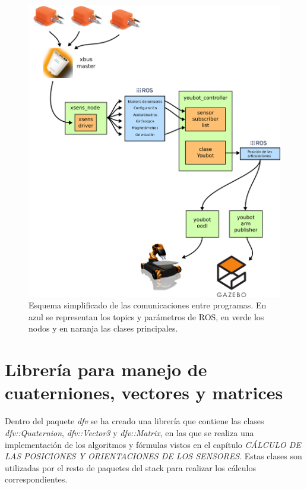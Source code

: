 \documentclass[12pt, a4paper]{report}
\begin{document}
\begin{figure}[h]
	\centering
		\includegraphics[scale=0.30]{../img/communications.png} 
	\caption[Esquema simplificado de comunicaciones]{Esquema simplificado de las comunicaciones entre programas. En azul se representan los topics y parámetros de ROS, en verde los nodos y en naranja las clases principales. } 
	\label{fig: communications}
\end{figure}

\section{Librería para manejo de cuaterniones, vectores y matrices}

Dentro del paquete \textit{dfv} se ha creado una librería que contiene las clases \textit{dfv::Quaternion}, \textit{dfv::Vector3} y \textit{dfv::Matrix}, en las que se realiza una implementación de los algoritmos y fórmulas vistos en el capítulo \textit{CÁLCULO DE LAS POSICIONES Y ORIENTACIONES DE LOS SENSORES}. Estas clases son utilizadas por el resto de paquetes del stack para realizar los cálculos correspondientes.
\end{document}
